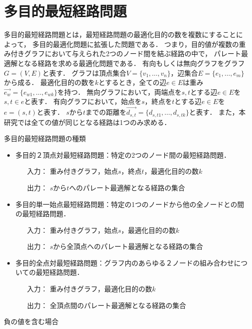 \documentclass[12pt]{optlab-bachelor}
\begin{document}
\section{多目的最短経路問題}
多目的最短経路問題とは，最短経路問題の最適化目的の数を複数にすることによって，
多目的最適化問題に拡張した問題である．
つまり，目的値が複数の重み付きグラフにおいて与えられた2つのノード間を結ぶ経路の中で，
パレート最適解となる経路を求める最適化問題である．
有向もしくは無向グラフをグラフ$G=(V,E)$と表す．
グラフは頂点集合$V=\{v_1,\ldots,v_n\}$，辺集合$E=\{e_1,\ldots,e_m\}$から成る．
最適化目的の数を$k$とするとき，全ての辺$e\in E$は重み$\vec{e_w} = \{e_{w1},\ldots,e_{wk}\}$を持つ．
無向グラフにおいて，両端点を$s,t$とする辺$e \in E$を$s,t \in e$と表す．
有向グラフにおいて，始点を$s$，終点を$t$とする辺$e \in E$を$e=(s,t)$と表す．
$s$から$t$までの距離を$\vec{d_{s,t}} = \{d_{s,t1},\ldots,d_{s,tk}\}$と表す．
また，本研究では全ての値が同じとなる経路は1つのみ求める．
\begin{description}
  \item[多目的最短経路問題の種類]
\end{description}
\begin{itemize}
\item 多目的２頂点対最短経路問題：特定の2つのノード間の最短経路問題．
  \begin{itemize}
    \item[入力：]重み付きグラフ，始点$s$，終点$t$，最適化目的の数$k$
    \item[出力：]$s$から$t$へのパレート最適解となる経路の集合
  \end{itemize}
  \item 多目的単一始点最短経路問題：特定の1つのノードから他の全ノードとの間の最短経路問題．
  \begin{itemize}
    \item[入力：]重み付きグラフ，始点$s$，最適化目的の数$k$
    \item[出力：]$s$から全頂点へのパレート最適解となる経路の集合
  \end{itemize}
  \item 多目的全点対最短経路問題：グラフ内のあらゆる２ノードの組み合わせについての最短経路問題．
  \begin{itemize}
    \item[入力：]重み付きグラフ，最適化目的の数$k$
    \item[出力：]全頂点間のパレート最適解となる経路の集合
  \end{itemize}
\end{itemize}
\begin{description}
  \item[負の値を含む場合]
\end{description}
\end{document}
